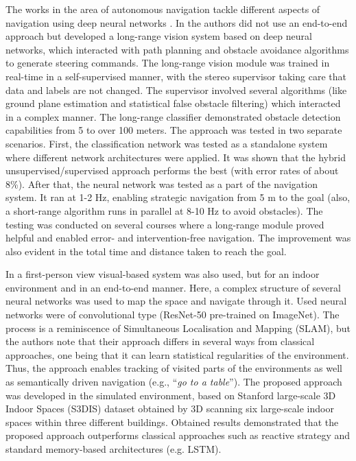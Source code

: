 The works in the area of autonomous navigation tackle different aspects of navigation using deep neural networks \cite{Zhu2017,Chen2015,ShalevShwartz2016,Hadsell2009,Gupta2017}. In \cite{Hadsell2009} the authors did not use an end-to-end approach but developed a long-range vision system based on deep neural networks, which interacted with path planning and obstacle avoidance algorithms to generate steering commands. The long-range vision module was trained in real-time in a self-supervised manner, with the stereo supervisor taking care that data and labels are not changed. The supervisor involved several algorithms (like ground plane estimation and statistical false obstacle filtering) which interacted in a complex manner. The long-range classifier demonstrated obstacle detection capabilities from 5 to over 100 meters. The approach was tested in two separate scenarios. First, the classification network was tested as a standalone system where different network architectures were applied. It was shown that the hybrid unsupervised/supervised approach performs the best (with error rates of about 8\%). After that, the neural network was tested as a part of the navigation system. It ran at 1-2 Hz, enabling strategic navigation from 5 m to the goal (also, a short-range algorithm runs in parallel at 8-10 Hz to avoid obstacles). The testing was conducted on several courses where a long-range module proved helpful and enabled error- and intervention-free navigation. The improvement was also evident in the total time and distance taken to reach the goal.

In \cite{Gupta2017} a first-person view visual-based system was also used, but for an indoor environment and in an end-to-end manner. Here, a complex structure of several neural networks was used to map the space and navigate through it. Used neural networks were of convolutional type (ResNet-50 pre-trained on ImageNet). The process is a reminiscence of Simultaneous Localisation and Mapping (SLAM), but the authors note that their approach differs in several ways from classical approaches, one being that it can learn statistical regularities of the environment. Thus, the approach enables tracking of visited parts of the environments as well as semantically driven navigation (e.g., ``\emph{go to a table}''). The proposed approach was developed in the simulated environment, based on Stanford large-scale 3D Indoor Spaces (S3DIS) dataset \cite{Armeni2016} obtained by 3D scanning six large-scale indoor spaces within three different buildings. Obtained results demonstrated that the proposed approach outperforms classical approaches such as reactive strategy and standard memory-based architectures (e.g. LSTM).

